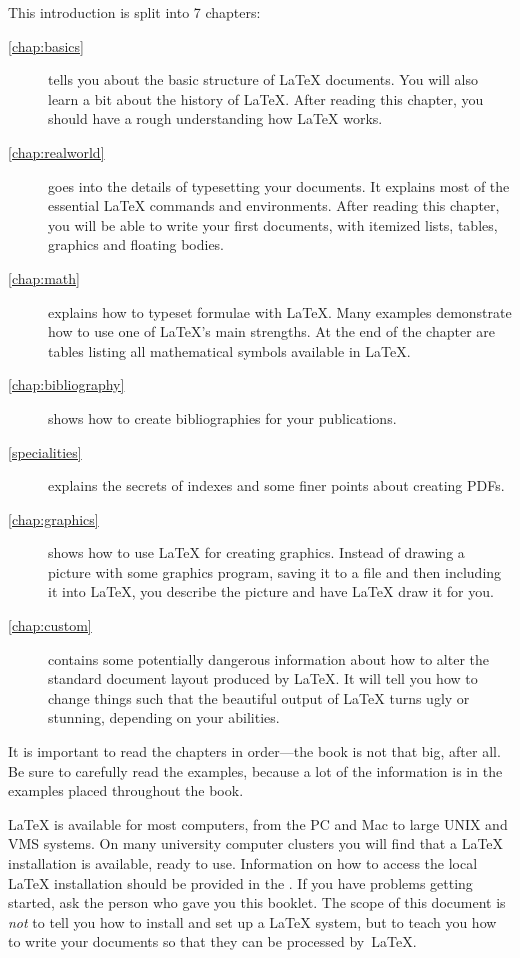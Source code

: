 \bigskip
\noindent This introduction is split into 7 chapters:
\begin{description}
  \item[\autoref{chap:basics}] tells you about the basic structure of
    \LaTeX{} documents. You will also learn a bit about the history of
    \LaTeX{}. After reading this chapter, you should have a rough understanding
    how \LaTeX{} works.
  \item[\autoref{chap:realworld}] goes into the details of typesetting your
    documents. It explains most of the essential \LaTeX{} commands and
    environments. After reading this chapter, you will be able to write your
    first documents, with itemized lists, tables, graphics and floating bodies.
  \item[\autoref{chap:math}] explains how to typeset formulae with \LaTeX.
    Many examples demonstrate how to use one of \LaTeX{}'s main strengths. At
    the end of the chapter are tables listing all mathematical symbols
    available in \LaTeX{}.
  \item[\autoref{chap:bibliography}] shows how to create bibliographies for
    your publications.
  \item[\autoref{specialities}] explains the secrets of indexes and some finer
    points about creating PDFs.
  \item[\autoref{chap:graphics}] shows how to use \LaTeX{} for creating
    graphics. Instead of drawing a picture with some graphics program, saving
    it to a file and then including it into \LaTeX{}, you describe the picture
    and have \LaTeX{} draw it for you.
  \item[\autoref{chap:custom}] contains some potentially dangerous
    information about how to alter the standard document layout produced by
    \LaTeX{}. It will tell you how  to change things such that the beautiful
    output of \LaTeX{} turns ugly or stunning, depending on your abilities.
\end{description}
\bigskip
\noindent It is important to read the chapters in order---the book is
not that big, after all. Be sure to carefully read the examples,
because a lot of the information is in the
examples placed throughout the book.

\bigskip
\noindent \LaTeX{} is available for most computers, from the PC and Mac to large
UNIX and VMS systems. On many university computer clusters you will
find that a \LaTeX{} installation is available, ready to use.
Information on how to access
the local \LaTeX{} installation should be provided in the \guide. If
you have problems getting started, ask the person who gave you this
booklet. The scope of this document is \emph{not} to tell you how to
install and set up a \LaTeX{} system, but to teach you how to write
your documents so that they can be processed by~\LaTeX{}.

